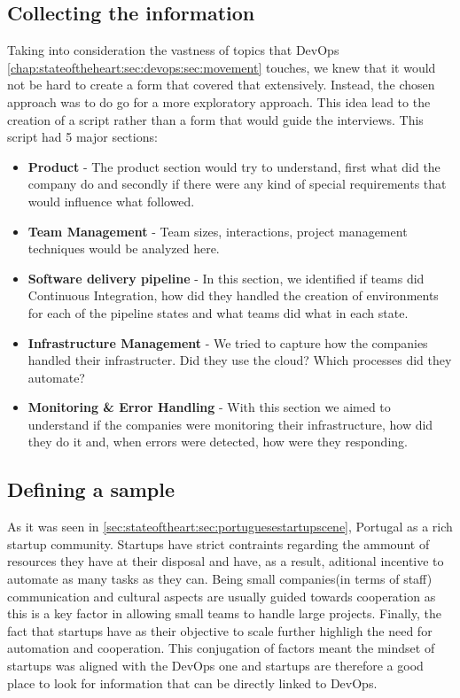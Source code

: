      \subsection{Collecting the information}
      Taking into consideration the vastness of topics that DevOps \ref{chap:stateoftheheart:sec:devops:sec:movement} touches, we knew that it would not be hard to create a form that covered that extensively. Instead, the chosen approach was to do go for a more exploratory approach. This idea lead to the creation of a script rather than a form that would guide the interviews. This script had 5 major sections:
      \begin{itemize}
          \item \textbf{Product} - The product section would try to understand, first what did the company do and secondly if there were any kind of special requirements that would influence what followed.
          \item \textbf{Team Management} - Team sizes, interactions, project management techniques would be analyzed here.
          \item \textbf{Software delivery pipeline} - In this section, we identified if teams did Continuous Integration, how did they handled the creation of environments for each of the pipeline states and what teams did what in each state.
          \item \textbf{Infrastructure Management} - We tried to capture how the companies handled their infrastructer. Did they use the cloud? Which processes did they automate?
          \item \textbf{Monitoring \& Error Handling} - With this section we aimed to understand if the companies were monitoring their infrastructure, how did they do it and, when errors were detected, how were they responding.
      \end{itemize}

      \subsection{Defining a sample} \label{chap:towardsdevops:sec:methodology:sec:sample}
      As it was seen in \ref{sec:stateoftheart:sec:portuguesestartupscene}, Portugal as a rich startup community. Startups have strict contraints regarding the ammount of resources they have at their disposal and have, as a result, aditional incentive to automate as many tasks as they can. Being small companies(in terms of staff) communication and cultural aspects are usually guided towards cooperation as this is a key factor in allowing small teams to handle large projects. Finally, the fact that startups have as their objective to scale further highligh the need for automation and cooperation. This conjugation of factors meant the mindset of startups was aligned with the DevOps one and startups are therefore a good place to look for information that can be directly linked to DevOps.

